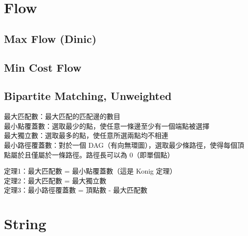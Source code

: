 \documentclass[10pt,oneside]{article}
\begin{document}
\begin{landscape}
\begin{multicols}{2}

\section{Flow}

\subsection{Max Flow (Dinic)}

\subsection{Min Cost Flow}

\subsection{Bipartite Matching, Unweighted}

{\normalsize
最大匹配數：最大匹配的匹配邊的數目\\
最小點覆蓋數：選取最少的點，使任意一條邊至少有一個端點被選擇\\
最大獨立數：選取最多的點，使任意所選兩點均不相連\\
最小路徑覆蓋數：對於一個 DAG（有向無環圖），選取最少條路徑，使得每個頂點屬於且僅屬於一條路徑。路徑長可以為 0（即單個點）\\
}

{\normalsize
定理1：最大匹配數 = 最小點覆蓋數（這是 Konig 定理）\\
定理2：最大匹配數 = 最大獨立數\\
定理3：最小路徑覆蓋數 = 頂點數 - 最大匹配數\\
}



\section{String}


\end{multicols}
\end{landscape}
\end{document}
